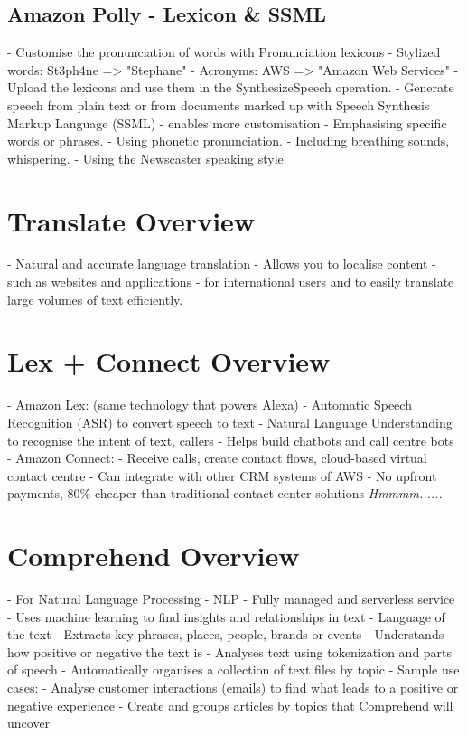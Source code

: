 \documentclass[11pt]{book}
\begin{document}
    \subsection{Amazon Polly - Lexicon \& SSML}
    - Customise the pronunciation of words with Pronunciation lexicons
    - Stylized words: St3ph4ne => "Stephane"
    - Acronyms: AWS => "Amazon Web Services"
    - Upload the lexicons and use them in the SynthesizeSpeech operation.
    - Generate speech from plain text or from documents marked up with Speech Synthesis Markup Language (SSML) - enables more customisation
    - Emphasising specific words or phrases.
    - Using phonetic pronunciation.
    - Including breathing sounds, whispering.
    - Using the Newscaster speaking style


    \section{Translate Overview}
    - Natural and accurate language translation
    - Allows you to localise content - such as websites and applications - for international users and to easily translate large volumes of text efficiently.


    \section{Lex + Connect Overview}
    - Amazon Lex: (same technology that powers Alexa)
    - Automatic Speech Recognition (ASR) to convert speech to text
    - Natural Language Understanding to recognise the intent of text, callers
    - Helps build chatbots and call centre bots
    - Amazon Connect:
    - Receive calls, create contact flows, cloud-based virtual contact centre
    - Can integrate with other CRM systems of AWS
    - No upfront payments, 80\% cheaper than traditional contact center solutions \textit{Hmmmm......}


    \section{Comprehend Overview}
    - For Natural Language Processing - NLP
    - Fully managed and serverless service
    - Uses machine learning to find insights and relationships in text
    - Language of the text
    - Extracts key phrases, places, people, brands or events
    - Understands how positive or negative the text is
    - Analyses text using tokenization and parts of speech
    - Automatically organises a collection of text files by topic
    - Sample use cases:
    - Analyse customer interactions (emails) to find what leads to a positive or negative experience
    - Create and groups articles by topics that Comprehend will uncover
\end{document}
